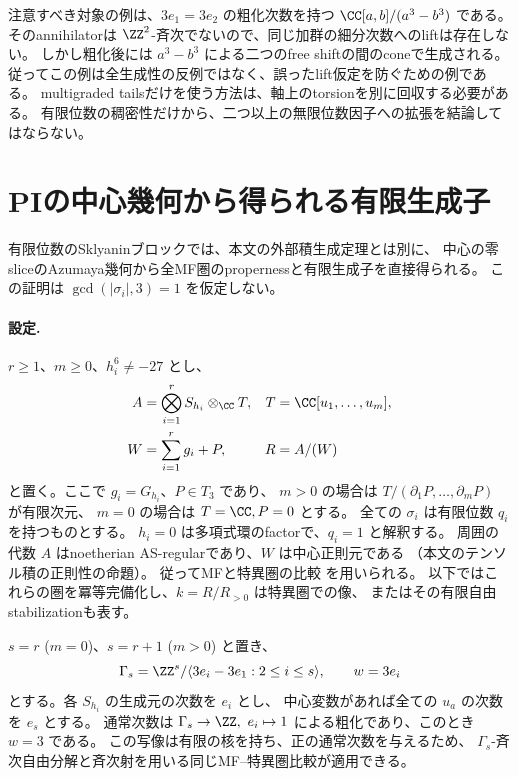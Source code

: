 注意すべき対象の例は、\(3e_1=3e_2\) の粗化次数を持つ
\(\CC[a,b]/(a^3-b^3)\) である。
そのannihilatorは \(\ZZ^2\)-斉次でないので、同じ加群の細分次数へのliftは存在しない。
しかし粗化後には \(a^3-b^3\) による二つのfree shiftの間のconeで生成される。
従ってこの例は全生成性の反例ではなく、誤ったlift仮定を防ぐための例である。
multigraded tailsだけを使う方法は、軸上のtorsionを別に回収する必要がある。
有限位数の稠密性だけから、二つ以上の無限位数因子への拡張を結論してはならない。

\section{PIの中心幾何から得られる有限生成子}
\label{sec:notes-pi-residue-generator}

有限位数のSklyaninブロックでは、本文の外部積生成定理とは別に、
中心の零sliceのAzumaya幾何から全MF圏のpropernessと有限生成子を直接得られる。
この証明は \(\gcd(|\sigma_i|,3)=1\) を仮定しない。

\paragraph{設定.}
\(r\ge1\)、\(m\ge0\)、\(h_i^6\ne-27\) とし、
\[
 \begin{aligned}
 A&=\bigotimes_{i=1}^rS_{h_i}\otimes_\CC T,
 &T&=\CC[u_1,\ldots,u_m],\\
 W&=\sum_{i=1}^r g_i+P,
 &R&=A/(W)
 \end{aligned}
\]
と置く。ここで \(g_i=G_{h_i}\)、\(P\in T_3\) であり、
\(m>0\) の場合は \(T/(\partial_1P,\ldots,\partial_mP)\) が有限次元、
\(m=0\) の場合は \(T=\CC,P=0\) とする。
全ての \(\sigma_i\) は有限位数 \(q_i\) を持つものとする。
\(h_i=0\) は多項式環のfactorで、\(q_i=1\) と解釈する。
周囲の代数 \(A\) はnoetherian AS-regularであり、\(W\) は中心正則元である
（本文のテンソル積の正則性の命題）。
従ってMFと特異圏の比較 \cite[Theorem 5.8]{CCKM} を用いられる。
以下ではこれらの圏を冪等完備化し、\(k=R/R_{>0}\) は特異圏での像、
またはその有限自由stabilizationも表す。

\(s=r\) (\(m=0\))、\(s=r+1\) (\(m>0\)) と置き、
\[
 \Gamma_s=\ZZ^s/\langle3e_i-3e_1:2\le i\le s\rangle,
 \qquad w=3e_i
\]
とする。各 \(S_{h_i}\) の生成元の次数を \(e_i\) とし、
中心変数があれば全ての \(u_a\) の次数を \(e_s\) とする。
通常次数は \(\Gamma_s\to\ZZ,\ e_i\mapsto1\) による粗化であり、このとき \(w=3\) である。
この写像は有限の核を持ち、正の通常次数を与えるため、
\(\Gamma_s\)-斉次自由分解と斉次射を用いる同じMF--特異圏比較が適用できる。

